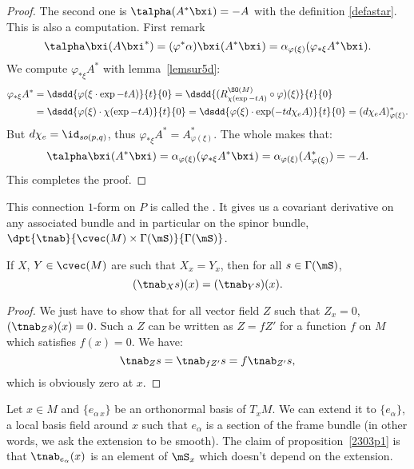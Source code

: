 \begin{proof}
The second one is $\talpha(A^*\bxi)=-A$ with the definition \eqref{defastar}. This is also a computation. First remark
\[
 \talpha\bxi(A\bxi^*)=(\varphi^*\alpha)\bxi(A^*\bxi)=\alpha_{\varphi(\xi)}(\varphi_{*\xi}A^*\bxi).
\]
 We compute $\varphi_{*\xi}A^*$ with lemma~\ref{lemsur5d}:
\begin{equation}
\begin{split}
 \varphi_{*\xi}A^*&=\dsdd{\varphi(\xi\cdot\exp -tA)}{t}{0} =\dsdd{(R_{\chi(\exp -tA)}^{\SO(M)}\circ\varphi)(\xi)}{t}{0}\\
              &=\dsdd{\varphi(\xi)\cdot\chi(\exp -tA)}{t}{0}=\dsdd{\varphi(\xi)\cdot\exp(-td\chi_eA)}{t}{0}=(d\chi_eA)^*_{\varphi(\xi)}.
\end{split}
\end{equation}
But $d\chi_e=\id_{so(p,q)}$, thus $\varphi_{*\xi}A^*=A^*_{\varphi(\xi)}$. The whole makes that:
\[
\talpha\bxi(A^*\bxi)=\alpha_{\varphi(\xi)}(\varphi_{*\xi}A^*\bxi)=\alpha_{\varphi(\xi)}(A^*_{\varphi(\xi)})=-A.
\]
This completes the proof.
\end{proof}

\begin{definition}
This connection $1$-form on $P$ is called the . It gives us a covariant derivative on any associated bundle and in particular on the spinor bundle, $\dpt{\tnab}{\cvec(M)\times\Gamma(\mS)}{\Gamma(\mS)}$.
 \label{spinconn}
\end{definition}

\begin{proposition}
If $X$, $Y\in\cvec(M)$ are such that $X_x=Y_x$, then for all $s\in\Gamma(\mS)$,
\[
              (\tnab_Xs)(x)=(\tnab_Ys)(x).
\]
 \label{2303p1}
\end{proposition}
\begin{proof}
We just have to show that for all vector field $Z$ such that $Z_x=0$, $(\tnab_Zs)(x)=0$. Such a $Z$ can be written as $Z=fZ'$ for a function $f$ on $M$ which satisfies $f(x)=0$. We have:
\[
\tnab_Zs=\tnab_{fZ'}s=f\tnab_{Z'}s,
\]
which is obviously zero at $x$.
\end{proof}

Let $x\in M$ and $\{e_{\alpha\,x}\}$ be an orthonormal basis of $T_xM$. We can extend it to $\{e_{\alpha}\}$, a local basis field around $x$ such that $e_{\alpha}$ is a section of the frame bundle (in other words, we ask the extension to be smooth). The claim of proposition~\ref{2303p1} is that $\tnab_{e_{\alpha}}(x)$ is an element of $\mS_x$ which doesn't depend on the extension.

